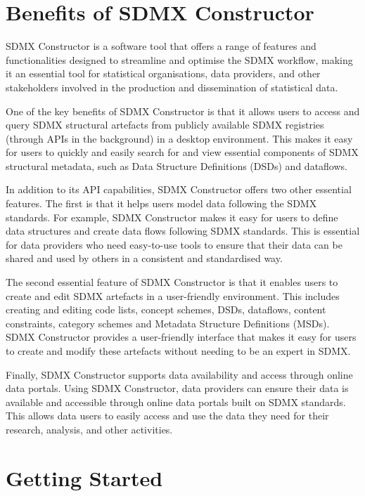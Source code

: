 \documentclass[
]{book}
\theoremstyle{definition}
\theoremstyle{definition}
\theoremstyle{definition}
\theoremstyle{definition}
\theoremstyle{remark}
\begin{document}
\hypertarget{benefits-of}{%
\chapter{Benefits of SDMX Constructor}\label{benefits-of}}

SDMX Constructor is a software tool that offers a range of features and functionalities designed to streamline and optimise the SDMX workflow, making it an essential tool for statistical organisations, data providers, and other stakeholders involved in the production and dissemination of statistical data.

One of the key benefits of SDMX Constructor is that it allows users to access and query SDMX structural artefacts from publicly available SDMX registries (through APIs in the background) in a desktop environment. This makes it easy for users to quickly and easily search for and view essential components of SDMX structural metadata, such as Data Structure Definitions (DSDs) and dataflows.

In addition to its API capabilities, SDMX Constructor offers two other essential features. The first is that it helps users model data following the SDMX standards. For example, SDMX Constructor makes it easy for users to define data structures and create data flows following SDMX standards. This is essential for data providers who need easy-to-use tools to ensure that their data can be shared and used by others in a consistent and standardised way.

The second essential feature of SDMX Constructor is that it enables users to create and edit SDMX artefacts in a user-friendly environment. This includes creating and editing code lists, concept schemes, DSDs, dataflows, content constraints, category schemes and Metadata Structure Definitions (MSDs). SDMX Constructor provides a user-friendly interface that makes it easy for users to create and modify these artefacts without needing to be an expert in SDMX.

Finally, SDMX Constructor supports data availability and access through online data portals. Using SDMX Constructor, data providers can ensure their data is available and accessible through online data portals built on SDMX standards. This allows data users to easily access and use the data they need for their research, analysis, and other activities.

\hypertarget{getting-started}{%
\chapter{Getting Started}\label{getting-started}}
\end{document}
